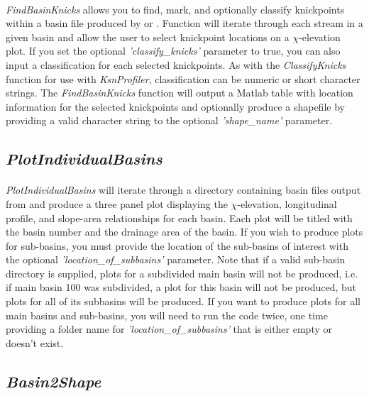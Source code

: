 \paragraph{}\textit{FindBasinKnicks} allows you to find, mark, and optionally classify knickpoints within a basin file produced by  or . Function will iterate through each stream in a given basin and allow the user to select knickpoint locations on a $\chi$-elevation plot. If you set the optional \textit{'classify\_knicks'} parameter to true, you can also input a classification for each selected knickpoints. As with the \textit{ClassifyKnicks} function for use with \textit{KsnProfiler}, classification can be numeric or short character strings. The \textit{FindBasinKnicks} function will output a Matlab table with location information for the selected knickpoints and optionally produce a shapefile by providing a valid character string to the optional \textit{'shape\_name'} parameter.

\subsection{\textit{PlotIndividualBasins}}
\paragraph{}\textit{PlotIndividualBasins} will iterate through a directory containing basin files output from  and produce a three panel plot displaying the $\chi$-elevation, longitudinal profile, and slope-area relationships for each basin. Each plot will be titled with the basin number and the drainage area of the basin. If you wish to produce plots for sub-basins, you must provide the location of the sub-basins of interest with the optional \textit{'location\_of\_subbasins'} parameter. Note that if a valid sub-basin directory is supplied, plots for a subdivided main basin will not be produced, i.e. if main basin 100 was subdivided, a plot for this basin will not be produced, but plots for all of its subbasins will be produced. If you want to produce plots for all main basins and sub-basins, you will need to run the code twice, one time providing a folder name for \textit{'location\_of\_subbasins'}  that is either empty or doesn't exist.

\subsection{\textit{Basin2Shape}} \label{sec:B2S}
